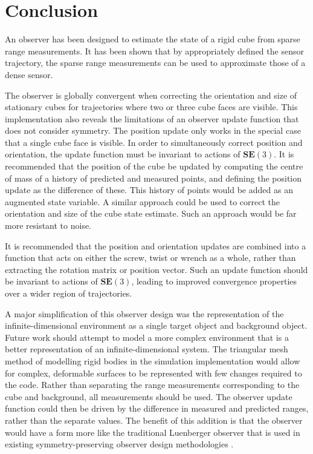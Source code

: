 \chapter*{Conclusion}

An observer has been designed to estimate the state of a rigid cube from sparse range measurements. It has been shown that by appropriately defined the sensor trajectory, the sparse range measurements can be used to approximate those of a dense sensor.

The observer is globally convergent when correcting the orientation and size of stationary cubes for trajectories where two or three cube faces are visible. This implementation also reveals the limitations of an observer update function that does not consider symmetry. The position update only works in the special case that a single cube face is visible. In order to simultaneously correct position and orientation, the update function must be invariant to actions of $\mathbf{SE}(3)$.
It is recommended that the position of the cube be updated by computing the centre of mass of a history of predicted and measured points, and defining the position update as the difference of these. This history of points would be added as an augmented state variable. A similar approach could be used to correct the orientation and size of the cube state estimate. Such an approach would be far more resistant to noise.

It is recommended that the position and orientation updates are combined into a function that acts on either the screw, twist or wrench as a whole, rather than extracting the rotation matrix or position vector. Such an update function should be invariant to actions of $\mathbf{SE}(3)$, leading to improved convergence properties over a wider region of trajectories.

A major simplification of this observer design was the representation of the infinite-dimensional environment as a single target object and background object. Future work should attempt to model a more complex environment that is a better representation of an infinite-dimensional system. The triangular mesh method of modelling rigid bodies in the simulation implementation would allow for complex, deformable surfaces to be represented with few changes required to the code. Rather than separating the range measurements corresponding to the cube and background, all measurements should be used. The observer update function could then be driven by the difference in measured and predicted ranges, rather than the separate values. The benefit of this addition is that the observer would have a form more like the traditional Luenberger observer that is used in existing symmetry-preserving observer design methodologies \cite{bonnabel2009non,mahony2013observers}.



